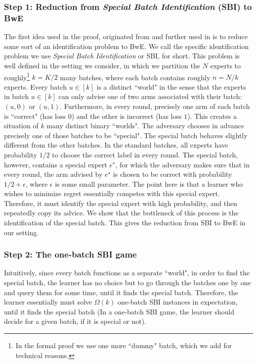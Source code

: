 \documentclass[a4paper,11pt]{article}
\theoremstyle{definition}
\begin{document}
\subsubsection{Step 1: Reduction from \emph{Special Batch Identification} (SBI) to BwE} \label{sec:sketch-1}
The first idea used in the proof, originated from \cite{chen2024interpolating} and further used in \cite{ito2024minimax} is to reduce some sort of an identification problem to BwE. We call the specific identification problem we use \emph{Special Batch Identification} or SBI, for short. This problem is well defined in the setting we consider, in which we partition the $N$ experts to roughly\footnote{In the formal proof we use one more ``dummy" batch, which we add for technical reasons.} $k = K/2$ many batches, where each batch contains roughly $n = N/k$ experts. Every batch $u \in [k]$ is a distinct ``world" in the sense that the experts in batch $u \in [k]$ can only advise one of two arms associated with their batch: $(u,0)$ or $(u,1)$. Furthermore, in every round, precisely one arm of each batch is ``correct" (has loss $0$) and the other is incorrect (has loss $1$). This creates a situation of $k$ many distinct binary ``worlds". The adversary chooses in advance precisely one of those batches to be ``special". The special batch behaves slightly different from the other batches. In the standard batches, all experts have probability $1/2$ to choose the correct label in every round. The special batch, however, contains a special expert $e^\star$, for which the adversary makes sure that in every round, the arm advised by $e^\star$ is chosen to be correct with probability $1/2+\epsilon$, where $\epsilon$ is some small parameter. The point here is that a learner who wishes to minimize regret essentially competes with this special expert. Therefore, it must identify the special expert with high probability, and then repeatedly copy its advice. We show that the bottleneck of this process is the identification of the special batch. This gives the reduction from SBI to BwE in our setting.
\subsubsection{Step 2: The one-batch SBI game}
Intuitively, since every batch functions as a separate ``world", in order to find the special batch, the learner has no choice but to go through the batches one by one and query them for some time, until it finds the special batch. Therefore, the learner essentially must solve $\Omega(k)$ one-batch SBI instances in expectation, until it finds the special batch (In a one-batch SBI game, the learner should decide for a given batch, if it is special or not). 
\end{document}

